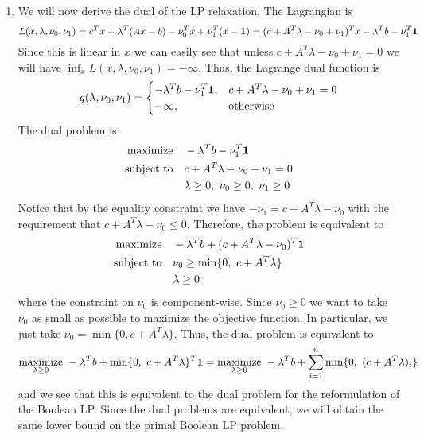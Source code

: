 \documentclass[11pt]{amsart}
\begin{document}
\begin{enumerate}
\begin{enumerate}
\item We will now derive the dual of the LP relaxation.  The Lagrangian is
\[
L(x,\lambda,\nu_0,\nu_1) = c^Tx + \lambda^T(Ax - b) - \nu_0^Tx + \nu_1^T(x - {\bf 1}) = (c + A^T\lambda - \nu_0 + \nu_1)^Tx - \lambda^Tb - \nu_1^T{\bf 1}
\]
Since this is linear in $x$ we can easily see that unless $c + A^T\lambda - \nu_0 + \nu_1 = 0$ we will have $\inf_x L(x,\lambda,\nu_0,\nu_1) = -\infty$.  Thus, the Lagrange dual function is
\[
g(\lambda,\nu_0,\nu_1) = \begin{cases}
-\lambda^Tb - \nu_1^T {\bf 1}, & c + A^T\lambda - \nu_0 + \nu_1 = 0\\
-\infty,& \text{otherwise}
\end{cases}
\]
The dual problem is 
\begin{equation*}
\begin{aligned}
\mathrm{maximize} \quad & -\lambda^Tb - \nu_1^T{\bf 1} \\
\textrm{subject to} \quad & c + A^T\lambda - \nu_0 + \nu_1 = 0\\
  &\lambda \ge 0,\ \nu_0 \ge 0,\ \nu_1 \ge 0\\
\end{aligned}
\end{equation*}
Notice that by the equality constraint we have $-\nu_1 = c + A^T\lambda - \nu_0$ with the requirement that $c + A^T\lambda - \nu_0 \le 0$.  Therefore, the problem is equivalent to 
\begin{equation*}
\begin{aligned}
\mathrm{maximize} \quad & -\lambda^Tb + (c + A^T\lambda - \nu_0)^T{\bf 1} \\
\textrm{subject to} \quad & \nu_0 \ge \min\{0,\ c + A^T \lambda\}\\
  &\lambda \ge 0\\
\end{aligned}
\end{equation*}
where the constraint on $\nu_0$ is component-wise.  Since $\nu_0 \ge 0$ we want to take $\nu_0$ as small as possible to maximize the objective function.  In particular, we just take $\nu_0 = \min\{0, c + A^T\lambda\}$.  Thus, the dual problem is equivalent to 
\[
\underset{\lambda \ge 0}{\mathrm{maximize}}\ -\lambda^Tb + \min\{0,\ c + A^T\lambda\}^T {\bf 1} = \underset{\lambda \ge 0}{\mathrm{maximize}}\ -\lambda^Tb + \sum_{i=1}^n  \min \{ 0,\ (c + A^T\lambda)_i \}
\]
and we see that this is equivalent to the dual problem for the reformulation of the Boolean LP.  Since the dual problems are equivalent, we will obtain the same lower bound on the primal Boolean LP problem.



\end{enumerate}
\end{enumerate}
\end{document}
